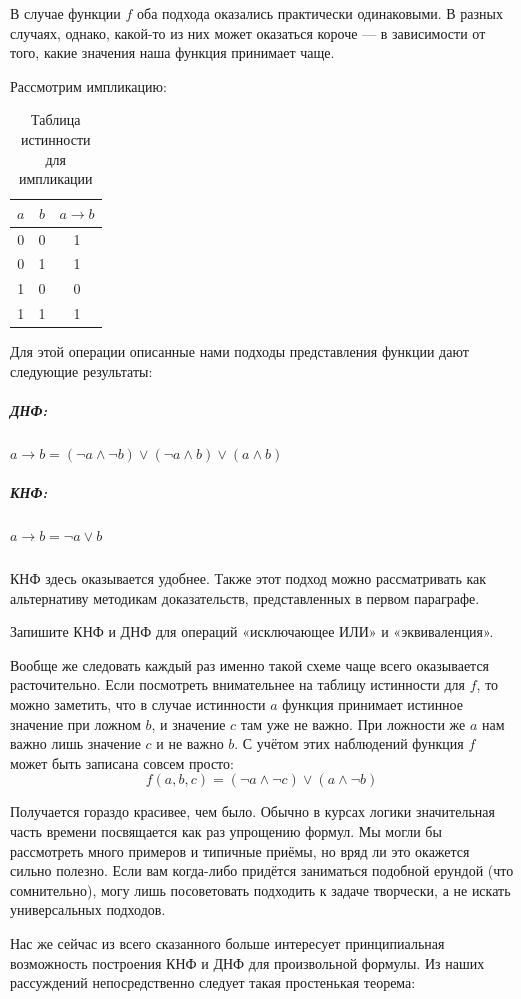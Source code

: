 В случае функции $f$ оба подхода оказались практически одинаковыми. В разных случаях, однако, какой-то из них может оказаться короче — в зависимости от того, какие значения наша функция принимает чаще.

Рассмотрим импликацию:

\begin{table}[h]
\centering
\begin{tabular}{cc|c}
$a$&$b$&$a\rightarrow b$\\
\hline
0&0&1 \\
0&1&1 \\
1&0&0 \\
1&1&1
\end{tabular}
\caption{Таблица истинности для импликации}
\end{table}

Для этой операции описанные нами подходы представления функции дают следующие результаты:

\subparagraph{ДНФ:} $a \rightarrow b = (\neg a\land \neg b)\lor(\neg a \land b)\lor(a\land b)$

\subparagraph{КНФ:} $a\rightarrow b = \neg a \lor b$

\subparagraph{} КНФ здесь оказывается удобнее. Также этот подход можно рассматривать как альтернативу методикам доказательств, представленных в первом параграфе.

\begin{exercise} Запишите КНФ и ДНФ для операций «исключающее ИЛИ» и «эквиваленция».\end{exercise}

Вообще же следовать каждый раз именно такой схеме чаще всего оказывается расточительно. Если посмотреть вни\-ма\-тельнее на таблицу истинности для $f$, то можно заметить, что в случае истинности $a$ функция принимает истинное значение при ложном $b$, и значение $c$ там уже не важно. При ложности же $a$ нам важно лишь значение $c$ и не важно $b$. С учётом этих наблюдений функция $f$ может быть записана совсем просто: $$f(a, b, c) = (\neg a\land \neg c) \lor (a \land \neg b)$$

Получается гораздо красивее, чем было. Обычно в курсах логики значительная часть времени посвящается как раз упрощению формул. Мы могли бы рассмотреть много примеров и типичные приёмы, но вряд ли это окажется сильно полезно. Если вам когда-либо придётся заниматься подобной ерундой (что сомнительно), могу лишь посоветовать подходить к задаче творчески, а не искать универсальных подходов.

Нас же сейчас из всего сказанного больше интересует принципиальная возможность построения КНФ и ДНФ для произвольной формулы. Из наших рассуждений непосредственно следует такая простенькая теорема:


